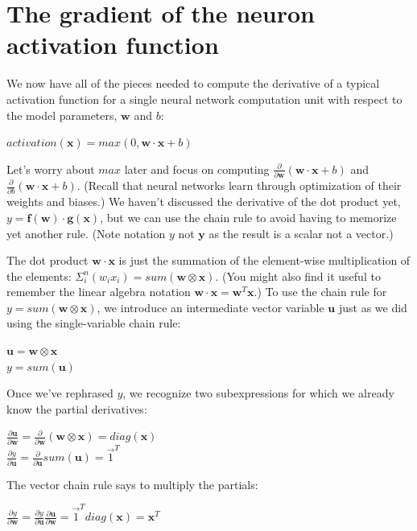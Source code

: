 \documentclass[11pt]{article}
\begin{document}
\section{The gradient of the neuron activation function}

We now have all of the pieces needed to compute the derivative of a typical activation function for a single neural network computation unit with respect to the model parameters, $\mathbf{w}$ and $b$:

$activation(\mathbf{x}) = max(0, \mathbf{w} \cdot \mathbf{x} + b)$

Let's worry about $max$ later and focus on computing $\frac{\partial}{\partial \mathbf{w}} (\mathbf{w} \cdot \mathbf{x} + b)$ and $\frac{\partial}{\partial b} (\mathbf{w} \cdot \mathbf{x} + b)$. (Recall that neural networks learn through optimization of their weights and biases.)  We haven't discussed the derivative of the dot product yet, $y = \mathbf{f(w)} \cdot \mathbf{g(x)}$, but we can use the chain rule to avoid having to memorize yet another rule. (Note notation $y$ not $\mathbf{y}$ as the result is a scalar not a vector.) 

The dot product $\mathbf{w} \cdot \mathbf{x}$ is just the summation of the element-wise multiplication of the elements: $\Sigma_i^n (w_i x_i) = sum(\mathbf{w} \otimes \mathbf{x})$. (You might also find it useful to remember the linear algebra notation $\mathbf{w} \cdot \mathbf{x} = \mathbf{w}^{T} \mathbf{x}$.) To use the chain rule for $y = sum(\mathbf{w} \otimes \mathbf{x})$, we introduce an intermediate vector variable $\mathbf{u}$ just as we did using the single-variable chain rule:

$\mathbf{u} = \mathbf{w} \otimes \mathbf{x}$\\
$y = sum(\mathbf{u})$

Once we've rephrased $y$, we recognize two subexpressions for which we already know the partial derivatives:

$\frac{\partial  \mathbf{u}}{\partial \mathbf{w}} = \frac{\partial }{\partial \mathbf{w}} (\mathbf{w} \otimes \mathbf{x}) = diag(\mathbf{x})$\\
$\frac{\partial y}{\partial \mathbf{u}} = \frac{\partial }{\partial \mathbf{u}} sum(\mathbf{u}) = \vec{1}^T$

The vector chain rule says to multiply the partials:

$\frac{\partial y}{\partial \mathbf{w}} = \frac{\partial y}{\partial \mathbf{u}} \frac{\partial \mathbf{u}}{\partial \mathbf{w}} = \vec{1}^T  diag(\mathbf{x}) = \mathbf{x}^T$
\end{document}
